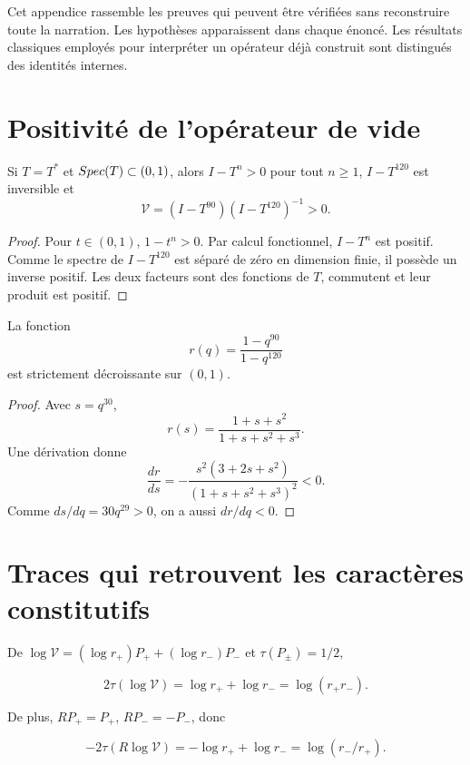 \label{hmt:p3:app:proofs}

Cet appendice rassemble les preuves qui peuvent être vérifiées sans reconstruire toute la narration. Les hypothèses apparaissent dans chaque énoncé. Les résultats classiques employés pour interpréter un opérateur déjà construit sont distingués des identités internes.

\section{Positivité de l’opérateur de vide}

\begin{lemma}
Si \(T=T^*\) et \(Spec(T)\subset(0,1)\), alors \(I-T^n>0\) pour tout \(n\ge1\), \(I-T^{120}\) est inversible et
\[
\mathcal V=(I-T^{90})(I-T^{120})^{-1}>0.
\]
\end{lemma}

\begin{proof}
Pour \(t\in(0,1)\), \(1-t^n>0\). Par calcul fonctionnel, \(I-T^n\) est positif. Comme le spectre de \(I-T^{120}\) est séparé de zéro en dimension finie, il possède un inverse positif. Les deux facteurs sont des fonctions de \(T\), commutent et leur produit est positif.
\end{proof}

\begin{lemma}
La fonction
\[
r(q)=\frac{1-q^{90}}{1-q^{120}}
\]
est strictement décroissante sur \((0,1)\).
\end{lemma}

\begin{proof}
Avec \(s=q^{30}\),
\[
r(s)=\frac{1+s+s^2}{1+s+s^2+s^3}.
\]
Une dérivation donne
\[
\frac{dr}{ds}=
-\frac{s^2(3+2s+s^2)}{(1+s+s^2+s^3)^2}<0.
\]
Comme \(ds/dq=30q^{29}>0\), on a aussi \(dr/dq<0\).
\end{proof}

\section{Traces qui retrouvent les caractères constitutifs}

De \(\log\mathcal V=(\log r_+)P_++(\log r_-)P_-\) et \(\tau(P_\pm)=1/2\),

\[
2\tau(\log\mathcal V)=\log r_++\log r_-=\log(r_+r_-).
\]

De plus, \(RP_+=P_+\), \(RP_-=-P_-\), donc

\[
-2\tau(R\log\mathcal V)
=-\log r_++\log r_-
=\log(r_-/r_+).
\]

